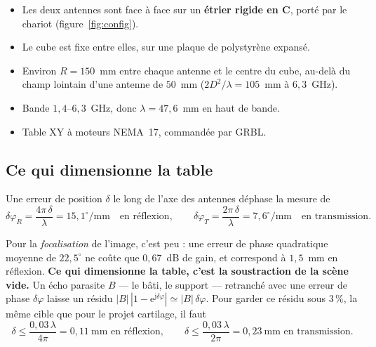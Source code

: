 \documentclass[11pt,a4paper]{article}
\newcommand{\ee}{\mathrm{e}}
\newcommand{\jj}{\mathrm{j}}
\begin{document}
\begin{itemize}
\item Les deux antennes sont face à face sur un \textbf{étrier rigide en C},
      porté par le chariot (figure~\ref{fig:config}).
\item Le cube est fixe entre elles, sur une plaque de polystyrène expansé.
\item Environ $R = 150$~mm entre chaque antenne et le centre du cube, au-delà du
      champ lointain d'une antenne de $50$~mm ($2D^2/\lambda = 105$~mm à
      $6{,}3$~GHz).
\item Bande $1{,}4$--$6{,}3$~GHz, donc $\lambda = 47{,}6$~mm en haut de bande.
\item Table XY à moteurs NEMA~17, commandée par GRBL.
\end{itemize}

\subsection{Ce qui dimensionne la table}
\label{sec:dimensionnement}

Une erreur de position $\delta$ le long de l'axe des antennes déphase la mesure
de
\[
  \delta\varphi_R = \frac{4\pi\,\delta}{\lambda} = 15{,}1^\circ/\text{mm}
  \quad\text{en réflexion}, \qquad
  \delta\varphi_T = \frac{2\pi\,\delta}{\lambda} = 7{,}6^\circ/\text{mm}
  \quad\text{en transmission}.
\]

Pour la \emph{focalisation} de l'image, c'est peu : une erreur de phase
quadratique moyenne de $22{,}5^\circ$ ne coûte que $0{,}67$~dB de gain, et
correspond à $1{,}5$~mm en réflexion. \textbf{Ce qui dimensionne la table, c'est
la soustraction de la scène vide.} Un écho parasite $B$ --- le bâti, le support
--- retranché avec une erreur de phase $\delta\varphi$ laisse un résidu
$|B|\,|1-\ee^{\jj\delta\varphi}| \simeq |B|\,\delta\varphi$. Pour garder ce résidu
sous $3\,\%$, la même cible que pour le projet cartilage, il faut
\[
  \delta \le \frac{0{,}03\,\lambda}{4\pi} = 0{,}11~\text{mm en réflexion},
  \qquad
  \delta \le \frac{0{,}03\,\lambda}{2\pi} = 0{,}23~\text{mm en transmission}.
\]
\end{document}
